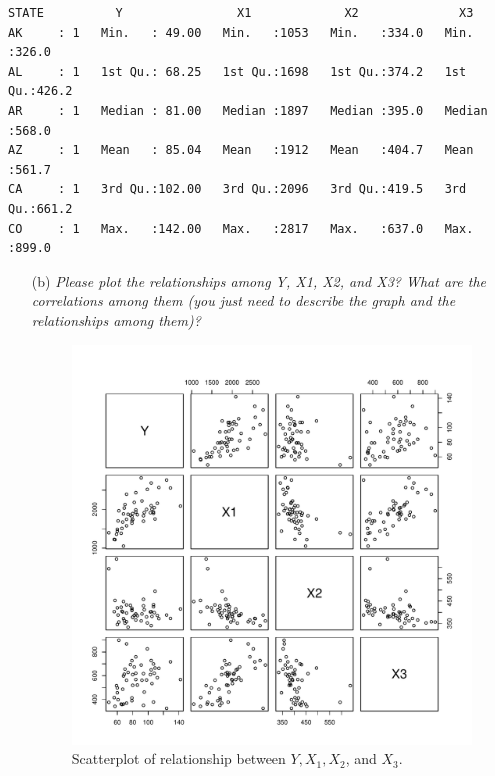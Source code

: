 \documentclass[12pt,letterpaper]{article}
\begin{document}
\begin{verbatim}
STATE          Y                X1             X2              X3       
AK     : 1   Min.   : 49.00   Min.   :1053   Min.   :334.0   Min.   :326.0  
AL     : 1   1st Qu.: 68.25   1st Qu.:1698   1st Qu.:374.2   1st Qu.:426.2  
AR     : 1   Median : 81.00   Median :1897   Median :395.0   Median :568.0  
AZ     : 1   Mean   : 85.04   Mean   :1912   Mean   :404.7   Mean   :561.7  
CA     : 1   3rd Qu.:102.00   3rd Qu.:2096   3rd Qu.:419.5   3rd Qu.:661.2  
CO     : 1   Max.   :142.00   Max.   :2817   Max.   :637.0   Max.   :899.0  
\end{verbatim}
\newpage
\begin{itemize}
\item [(b)] 
\emph{Please plot the relationships among \emph{Y}, \emph{X1}, \emph{X2}, and \emph{X3}? What are the correlations among them (you just need to describe the graph and the relationships among them)?}

  
\vspace{.25cm}

\begin{figure}[h!]\centering

	\caption{\footnotesize Scatterplot of relationship between $Y, X_1, X_2$, and $X_3$.}
		\label{fig:plot_3b}
	\includegraphics[width=.85\textwidth]{plot_3b.pdf}
\end{figure}


\end{itemize}
\end{document}
